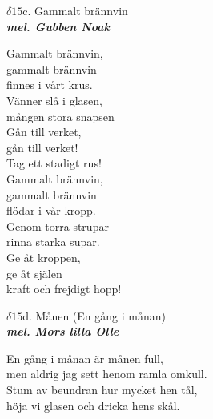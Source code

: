 \documentclass[a6paper,10pt]{article}
\newcommand{\mel}[1]{\small\textbf{\textit{mel. #1 \\}}}
\begin{document}
\newpage
\setlength{\oddsidemargin}{-0.47in}
\noindent
\begin{center}
\Large $\delta15$c. Gammalt brännvin\\ 
\mel{Gubben Noak}
\end{center}
Gammalt brännvin, \\
gammalt brännvin \\
finnes i vårt krus. \\
Vänner slå i glasen, \\
mången stora snapsen \\
Gån till verket, \\
gån till verket! \\
Tag ett stadigt rus! 
\vspace{5pt}\\
Gammalt brännvin, \\
gammalt brännvin \\
flödar i vår kropp. \\
Genom torra strupar \\
rinna starka supar. \\
Ge åt kroppen, \\
ge åt själen \\
kraft och frejdigt hopp! 
\vspace{50pt}
\begin{center}
\Large $\delta15$d. Månen (En gång i månan)\\
\mel{Mors lilla Olle}
\end{center}
En gång i månan är månen full, \\
men aldrig jag sett henom ramla omkull. \\
Stum av beundran hur mycket hen tål, \\
höja vi glasen och dricka hens skål. 
\end{document}
